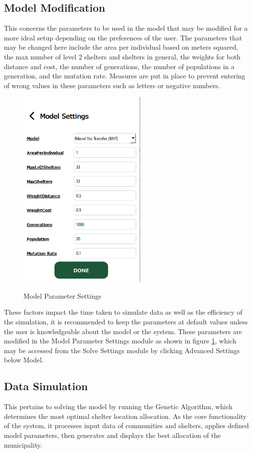 \subsection{Model Modification}
	This concerns the parameters to be used in the model that may be modified for a more ideal setup depending on the preferences of the user. The parameters that may be changed here include the area per individual based on meters squared, the max number of level 2 shelters and shelters in general, the weights for both distance and cost, the number of generations, the number of populations in a generation, and the mutation rate. Measures are put in place to prevent entering of wrong values in these parameters such as letters or negative numbers. 
	
	\begin{figure}[h!]
		\caption{Model Parameter Settings}
		\centering
		\includegraphics[width=2.5in]{Chapter 4/modelsettings}
		\label{modelSet}
	\end{figure}
	These factors impact the time taken to simulate data as well as the efficiency of the simulation, it is recommended to keep the parameters at default values unless the user is knowledgeable about the model or the system. These parameters are modified in the Model Parameter Settings module as shown in figure \ref{modelSet}, which may be accessed from the Solve Settings module by clicking Advanced Settings below Model.
	
	
\subsection{Data Simulation}
	This pertains to solving the model by running the Genetic Algorithm, which determines the most optimal shelter location allocation. As the core functionality of the system, it processes input data of communities and shelters, applies defined model parameters, then generates and displays the best allocation of the municipality.
	
